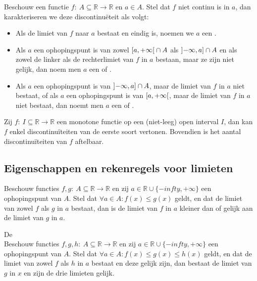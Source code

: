 \documentclass[main.tex]{subfiles}
\begin{document}
\begin{de}
  Beschouw een functie $f:\ A \subseteq \mathbb{R} \rightarrow \mathbb{R}$ en $a\in A$.
  Stel dat $f$ niet continu is in $a$, dan karakteriseren we deze discontinu\"eteit als volgt:
  \begin{itemize}
  \item Als de limiet van $f$ naar $a$ bestaat en eindig is, noemen we $a$ een .
  \item Als $a$ een ophopingspunt is van zowel $\interval[open right]{a}{+\infty} \cap A$ als $\interval[open left]{-\infty}{a} \cap A$ en als zowel de linker als de rechterlimiet van $f$ in $a$ bestaan, maar ze zijn niet gelijk, dan noem men $a$ een  of .
  \item Als $a$ een ophopingspunt is van $\interval[open left]{-\infty}{a} \cap A$, maar de limiet van $f$ in $a$ niet bestaat, of als $a$ een ophopingspunt is van $\interval[open right]{a}{+\infty}$, maar de limiet van $f$ in $a$ niet bestaat, dan noemt men $a$ een  of .
  \end{itemize}
\end{de}

\begin{pr}
  Zij $f:\ I \subseteq \mathbb{R} \rightarrow \mathbb{R}$ een monotone functie op een (niet-leeg) open interval $I$, dan kan $f$ enkel discontinu\"iteiten van de eerste soort vertonen.
  Bovendien is het aantal discontinu\"iteiten van $f$ aftelbaar.
\end{pr}


\subsection{Eigenschappen en rekenregels voor limieten}
\label{sec:eigensch-en-rekenr}

\begin{pr}
  Beschouw functies $f,g:\ A \subseteq \mathbb{R} \rightarrow \mathbb{R}$ en zij $a\in \mathbb{R} \cup \{-infty,+\infty\}$ een ophopingspunt van $A$.
  Stel dat $\forall a\in A: f(x) \le g(x)$ geldt, en dat de limiet van zowel $f$ als $g$ in $a$ bestaat, dan is de limiet van $f$ in $a$ kleiner dan of gelijk aan de limiet van $g$ in $a$.\
\end{pr}

\begin{st}
  De \\
  Beschouw functies $f,g,h:\ A \subseteq \mathbb{R} \rightarrow \mathbb{R}$ en zij $a\in \mathbb{R} \cup \{-infty,+\infty\}$ een ophopingspunt van $A$.
  Stel dat $\forall a\in A: f(x) \le g(x) \le h(x)$ geldt, en dat de limiet van zowel $f$ als $h$ in $a$ bestaat en deze gelijk zijn, dan bestaat de limiet van $g$ in $x$ en zijn de drie limieten gelijk.
\extra{bewijs}
\end{st}
\end{document}
